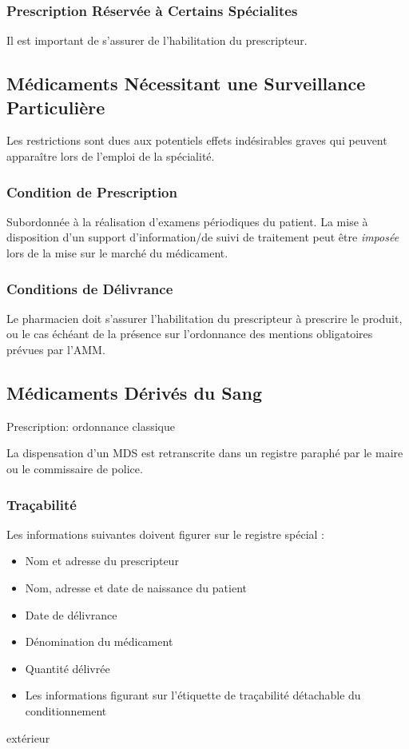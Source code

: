 \documentclass[11pt]{article}
\begin{document}
\subsubsection{Prescription Réservée à Certains Spécialites}
\label{sec:org1dee536}
Il est important de s'assurer de l'habilitation du prescripteur.

\subsection{Médicaments Nécessitant une Surveillance Particulière}
\label{sec:orgbb425ef}
Les restrictions sont dues aux potentiels effets indésirables graves qui peuvent apparaître lors de l'emploi de la spécialité.

\subsubsection{Condition de Prescription}
\label{sec:org0be6593}
Subordonnée à la réalisation d'examens périodiques du patient.
La mise à disposition d'un support d'information/de suivi de traitement peut être \emph{imposée} lors de la mise sur le marché du médicament.

\subsubsection{Conditions de Délivrance}
\label{sec:org7281bd6}
Le pharmacien doit s'assurer l'habilitation du prescripteur à prescrire le produit, ou le cas échéant de la présence sur l'ordonnance des mentions obligatoires prévues par l'AMM.

\subsection{Médicaments Dérivés du Sang}
\label{sec:org6fc6f6f}
Prescription: ordonnance classique

La dispensation d'un MDS est retranscrite dans un registre paraphé par le maire ou le commissaire de police.

\subsubsection{Traçabilité}
\label{sec:orgd9bfe60}
Les informations suivantes doivent figurer sur le registre spécial :
\begin{itemize}
\item Nom et adresse du prescripteur
\item Nom, adresse et date de naissance du patient
\item Date de délivrance
\item Dénomination du médicament
\item Quantité délivrée
\item Les informations figurant sur l'étiquette de traçabilité détachable du conditionnement
\end{itemize}
extérieur
\end{document}

